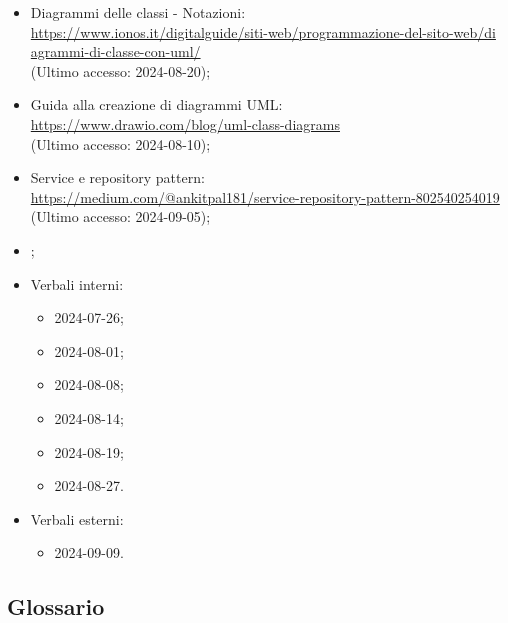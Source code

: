 \begin{itemize}
  \item Diagrammi delle classi - Notazioni:\\ \href{https://www.ionos.it/digitalguide/siti-web/programmazione-del-sito-web/diagrammi-di-classe-con-uml/}{https://www.ionos.it/digitalguide/siti-web/programmazione-del-sito-web/di \- agrammi-di-classe-con-uml/} \\ (Ultimo accesso: 2024-08-20);
  \item Guida alla creazione di diagrammi UML:\\ \href{https://www.drawio.com/blog/uml-class-diagrams}{https://www.drawio.com/blog/uml-class-diagrams} \\ (Ultimo accesso: 2024-08-10);
  \item Service e repository pattern:\\ \href{https://medium.com/@ankitpal181/service-repository-pattern-802540254019}{https://medium.com/@ankitpal181/service-repository-pattern-802540254019} \\ (Ultimo accesso: 2024-09-05);
  \item \Glossario;
  \item Verbali interni:
  \begin{itemize}
    \item 2024-07-26;
    \item 2024-08-01;
    \item 2024-08-08;
    \item 2024-08-14;
    \item 2024-08-19;
    \item 2024-08-27.
  \end{itemize}
  \item Verbali esterni:
  \begin{itemize}
    \item 2024-09-09.
  \end{itemize}
\end{itemize}

\subsection{Glossario} 
\GlossarioIntroduzione

